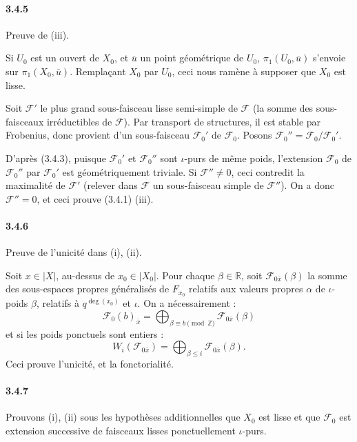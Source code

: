\documentclass[12pt,a4paper]{article}
\theoremstyle{plain}
\theoremstyle{definition}
\theoremstyle{remark}
\newcommand{\RR}{{\mathbb{R}}}
\newcommand{\ZZ}{{\mathbb{Z}}}
\begin{document}
\paragraph{3.4.5}
Preuve de (iii).


Si $U_0$ est un ouvert de $X_0$, et $\overline{u}$ un point g\'eom\'etrique de $U_0$, $\pi_1(U_0, \overline{u})$ s'envoie sur $\pi_1(X_0, \overline{u})$. Rempla\c{c}ant $X_0$ par $U_0$, ceci nous ram\`ene \`a supposer que $X_0$ est lisse.

Soit $\mathscr{F}'$ le plus grand sous-faisceau lisse semi-simple de $\mathscr{F}$ (la somme des sous-faisceaux irr\'eductibles de $\mathscr{F}$). Par transport de structures, il est stable par Frobenius, donc provient d'un sous-faisceau $\mathscr{F}_0'$ de $\mathscr{F}_0$. Posons $\mathscr{F}_0'' = \mathscr{F}_0 / \mathscr{F}_0'$.

D'apr\`es (3.4.3), puisque $\mathscr{F}_0'$ et $\mathscr{F}_0''$ sont $\iota$-purs de m\^eme poids, l'extension $\mathscr{F}_0$ de $\mathscr{F}_0''$ par $\mathscr{F}_0'$ est g\'eom\'etriquement triviale. Si $\mathscr{F}'' \neq 0$, ceci contredit la maximalit\'e de $\mathscr{F}'$ (relever dans $\mathscr{F}$ un sous-faisceau simple de $\mathscr{F}''$). On a donc $\mathscr{F}'' = 0$, et ceci prouve (3.4.1) (iii).

\paragraph{3.4.6}
Preuve de l'unicit\'e dans (i), (ii).


Soit $x \in |X|$, au-dessus de $x_0 \in |X_0|$. Pour chaque $\beta \in \RR$, soit $\mathscr{F}_{0\overline{x}}(\beta)$ la somme des sous-espaces propres g\'en\'eralis\'es de $F_{x_0}$ relatifs aux valeurs propres $\alpha$ de $\iota$-poids $\beta$, relatifs \`a $q^{\deg(x_0)}$ et $\iota$. On a n\'ecessairement :
\[ \mathscr{F}_0(b)_{\overline{x}} = \bigoplus_{\beta \equiv b \pmod{\ZZ}} \mathscr{F}_{0\overline{x}}(\beta) \]
et si les poids ponctuels sont entiers :
\[ W_i(\mathscr{F}_{0\overline{x}}) = \bigoplus_{\beta \leq i} \mathscr{F}_{0\overline{x}}(\beta). \]
Ceci prouve l'unicit\'e, et la fonctorialit\'e.

\paragraph{3.4.7}
Prouvons (i), (ii) sous les hypoth\`eses additionnelles que $X_0$ est lisse et que $\mathscr{F}_0$ est extension successive de faisceaux lisses ponctuellement $\iota$-purs.
\end{document}
